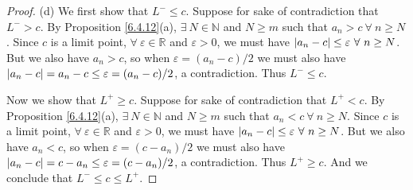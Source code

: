 \begin{proof}{(d)}
We first show that \(L^- \leq c\).
Suppose for sake of contradiction that \(L^- > c\).
By Proposition \ref{6.4.12}(a), \(\exists\ N \in \mathds{N}\) and \(N \geq m\) such that \(a_n > c \ \forall\ n \geq N\).
Since \(c\) is a limit point, \(\forall\ \varepsilon \in \mathds{R}\) and \(\varepsilon > 0\), we must have \(\abs*{a_n - c} \leq \varepsilon \ \forall\ n \geq N\).
But we also have \(a_n > c\), so when \(\varepsilon = (a_n - c) / 2\) we must also have \(\abs*{a_n - c} = a_n - c \leq \varepsilon = (a_n - c) / 2\), a contradiction.
Thus \(L^- \leq c\).

Now we show that \(L^+ \geq c\).
Suppose for sake of contradiction that \(L^+ < c\).
By Proposition \ref{6.4.12}(a), \(\exists\ N \in \mathds{N}\) and \(N \geq m\) such that \(a_n < c \ \forall\ n \geq N\).
Since \(c\) is a limit point, \(\forall\ \varepsilon \in \mathds{R}\) and \(\varepsilon > 0\), we must have \(\abs*{a_n - c} \leq \varepsilon \ \forall\ n \geq N\).
But we also have \(a_n < c\), so when \(\varepsilon = (c - a_n) / 2\) we must also have \(\abs*{a_n - c} = c - a_n \leq \varepsilon = (c - a_n) / 2\), a contradiction.
Thus \(L^+ \geq c\).
And we conclude that \(L^- \leq c \leq L^+\).
\end{proof}

